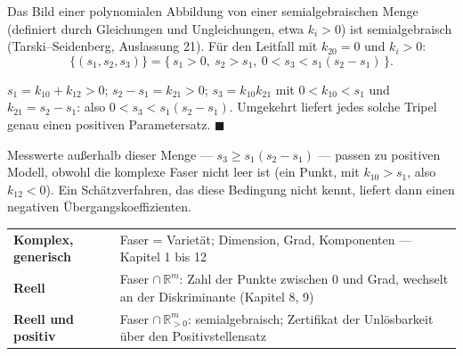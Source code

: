 \begin{merksatz}
Das Bild einer polynomialen Abbildung von einer semialgebraischen Menge (definiert durch Gleichungen und Ungleichungen, etwa $k_i > 0$) ist semialgebraisch (Tarski--Seidenberg, Auslassung 21). Für den Leitfall mit $k_{20} = 0$ und $k_i > 0$:
\[ \{(s_1, s_2, s_3)\} = \bigl\{\,s_1 > 0,\ s_2 > s_1,\ 0 < s_3 < s_1(s_2 - s_1)\,\bigr\} . \]

$s_1 = k_{10} + k_{12} > 0$; $s_2 - s_1 = k_{21} > 0$; $s_3 = k_{10}k_{21}$ mit $0 < k_{10} < s_1$ und $k_{21} = s_2 - s_1$: also $0 < s_3 < s_1(s_2 - s_1)$. Umgekehrt liefert jedes solche Tripel genau einen positiven Parametersatz. $\blacksquare$

Messwerte außerhalb dieser Menge --- $s_3\ge s_1(s_2 - s_1)$ --- passen zu  positiven Modell, obwohl die komplexe Faser nicht leer ist (ein Punkt, mit $k_{10} > s_1$, also $k_{12} < 0$). Ein Schätzverfahren, das diese Bedingung nicht kennt, liefert dann einen negativen Übergangskoeffizienten.

\begin{center}
{\small
\renewcommand{\arraystretch}{1.5}
\begin{tabular}{@{}P{3.0cm}P{5.8cm}@{}}
\toprule
\textbf{Komplex, generisch} & Faser = Varietät; Dimension, Grad, Komponenten --- Kapitel 1 bis 12\\
\textbf{Reell} & Faser $\cap\,\mathbb R^{m}$: Zahl der Punkte zwischen $0$ und Grad, wechselt an der Diskriminante (Kapitel 8, 9)\\
\textbf{Reell und positiv} & Faser $\cap\,\mathbb R_{>0}^{m}$: semialgebraisch; Zertifikat der Unlösbarkeit über den Positivstellensatz\\
\bottomrule
\end{tabular}}
\end{center}

\begin{center}
\begin{minipage}{0.88\textwidth}
\end{minipage}
\end{center}
\end{merksatz}

